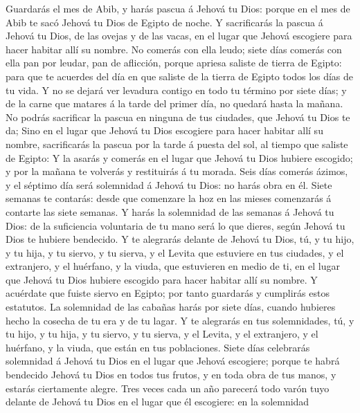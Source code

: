  Guardarás el mes de Abib, y harás pascua á Jehová tu Dios:
porque en el mes de Abib te sacó Jehová tu Dios de Egipto de noche.
 Y sacrificarás la pascua á Jehová tu Dios, de las ovejas y
de las vacas, en el lugar que Jehová escogiere para hacer habitar allí
su nombre.  No comerás con ella leudo; siete días comerás
con ella pan por leudar, pan de aflicción, porque apriesa saliste de
tierra de Egipto: para que te acuerdes del día en que saliste de la
tierra de Egipto todos los días de tu vida.  Y no se dejará
ver levadura contigo en todo tu término por siete días; y de la carne
que matares á la tarde del primer día, no quedará hasta la mañana.
 No podrás sacrificar la pascua en ninguna de tus ciudades,
que Jehová tu Dios te da;  Sino en el lugar que Jehová tu
Dios escogiere para hacer habitar allí su nombre, sacrificarás la pascua
por la tarde á puesta del sol, al tiempo que saliste de Egipto:
 Y la asarás y comerás en el lugar que Jehová tu Dios
hubiere escogido; y por la mañana te volverás y restituirás á tu morada.
 Seis días comerás ázimos, y el séptimo día será solemnidad
á Jehová tu Dios: no harás obra en él.  Siete semanas te
contarás: desde que comenzare la hoz en las mieses comenzarás á contarte
las siete semanas.  Y harás la solemnidad de las semanas á
Jehová tu Dios: de la suficiencia voluntaria de tu mano será lo que
dieres, según Jehová tu Dios te hubiere bendecido.  Y te
alegrarás delante de Jehová tu Dios, tú, y tu hijo, y tu hija, y tu
siervo, y tu sierva, y el Levita que estuviere en tus ciudades, y el
extranjero, y el huérfano, y la viuda, que estuvieren en medio de ti, en
el lugar que Jehová tu Dios hubiere escogido para hacer habitar allí su
nombre.  Y acuérdate que fuiste siervo en Egipto; por tanto
guardarás y cumplirás estos estatutos.  La solemnidad de
las cabañas harás por siete días, cuando hubieres hecho la cosecha de tu
era y de tu lagar.  Y te alegrarás en tus solemnidades, tú,
y tu hijo, y tu hija, y tu siervo, y tu sierva, y el Levita, y el
extranjero, y el huérfano, y la viuda, que están en tus poblaciones.
 Siete días celebrarás solemnidad á Jehová tu Dios en el
lugar que Jehová escogiere; porque te habrá bendecido Jehová tu Dios en
todos tus frutos, y en toda obra de tus manos, y estarás ciertamente
alegre.  Tres veces cada un año parecerá todo varón tuyo
delante de Jehová tu Dios en el lugar que él escogiere: en la solemnidad
